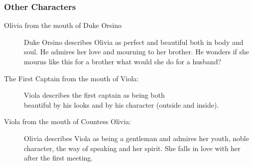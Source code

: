 \documentclass[12pt, a4paper]{article}
\begin{document}
\subsubsection*{Other Characters}

\begin{description}
  \item[Olivia from the mouth of Duke Orsino] Duke Orsino describes Olivia as perfect and beautiful both in body and soul.
    He admires her love and mourning to her brother. He wonders if she mourns like this for a brother what
    would she do for a husband?

  \item[The First Captain from the mouth of Viola:] Viola describes the first captain as
    being both \\beautiful by his looks and by his character (outside and inside).

  \item[Viola from the mouth of Countess Olivia:] Olivia describes Viola as being a gentleman and
    admires her youth, noble character, the way of speaking and her spirit.
    She falls in love with her after the first meeting.
\end{description}
\end{document}
